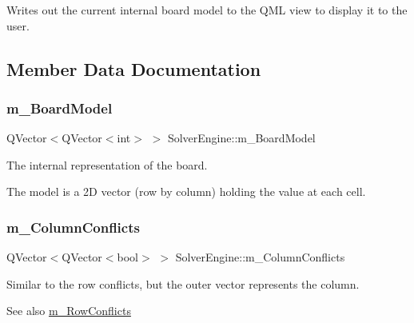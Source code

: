 Writes out the current internal board model to the Q\+ML view to display it to the user. 



\subsection{Member Data Documentation}
\mbox{\label{class_solver_engine_a8492d43cc29ddd63325be3f2ea9ee647}} 
\subsubsection{\texorpdfstring{m\+\_\+\+Board\+Model}{m\_BoardModel}}
{\footnotesize\ttfamily Q\+Vector$<$Q\+Vector$<$int$>$ $>$ Solver\+Engine\+::m\+\_\+\+Board\+Model\hspace{0.3cm}{\ttfamily [private]}}



The internal representation of the board. 

The model is a 2D vector (row by column) holding the value at each cell. \mbox{\label{class_solver_engine_a31443447551a97647ac50f4090c51a3f}} 
\subsubsection{\texorpdfstring{m\+\_\+\+Column\+Conflicts}{m\_ColumnConflicts}}
{\footnotesize\ttfamily Q\+Vector$<$Q\+Vector$<$bool$>$ $>$ Solver\+Engine\+::m\+\_\+\+Column\+Conflicts\hspace{0.3cm}{\ttfamily [private]}}



Similar to the row conflicts, but the outer vector represents the column. 

\begin{DoxySeeAlso}{See also}
\mbox{\hyperlink{class_solver_engine_ab2c80d6912f12a59297ff17788eb15ff}{m\+\_\+\+Row\+Conflicts}} 
\end{DoxySeeAlso}
\mbox{\label{class_solver_engine_a0abb18c17bb48fafff933fcf68ce6bbc}} 
